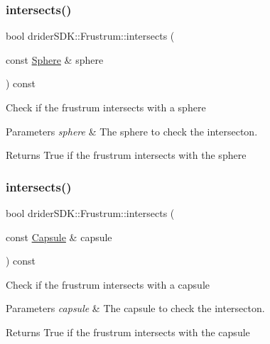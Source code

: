 \subsubsection{\texorpdfstring{intersects()}{intersects()}\hspace{0.1cm}{\footnotesize\ttfamily [3/5]}}
{\footnotesize\ttfamily bool drider\+S\+D\+K\+::\+Frustrum\+::intersects (\begin{DoxyParamCaption}\item[{const \hyperlink{classdrider_s_d_k_1_1_sphere}{Sphere} \&}]{sphere }\end{DoxyParamCaption}) const}

Check if the frustrum intersects with a sphere


\begin{DoxyParams}{Parameters}
{\em sphere} & The sphere to check the intersecton.\\
\hline
\end{DoxyParams}
\begin{DoxyReturn}{Returns}
True if the frustrum intersects with the sphere 
\end{DoxyReturn}
\mbox{\label{classdrider_s_d_k_1_1_frustrum_a3780470da8c8263dec38ecaa267a46e8}} 
\subsubsection{\texorpdfstring{intersects()}{intersects()}\hspace{0.1cm}{\footnotesize\ttfamily [4/5]}}
{\footnotesize\ttfamily bool drider\+S\+D\+K\+::\+Frustrum\+::intersects (\begin{DoxyParamCaption}\item[{const \hyperlink{classdrider_s_d_k_1_1_capsule}{Capsule} \&}]{capsule }\end{DoxyParamCaption}) const}

Check if the frustrum intersects with a capsule


\begin{DoxyParams}{Parameters}
{\em capsule} & The capsule to check the intersecton.\\
\hline
\end{DoxyParams}
\begin{DoxyReturn}{Returns}
True if the frustrum intersects with the capsule 
\end{DoxyReturn}
\mbox{\label{classdrider_s_d_k_1_1_frustrum_ae7d0c8ccb2301939f6b41c09d26b8304}} 
